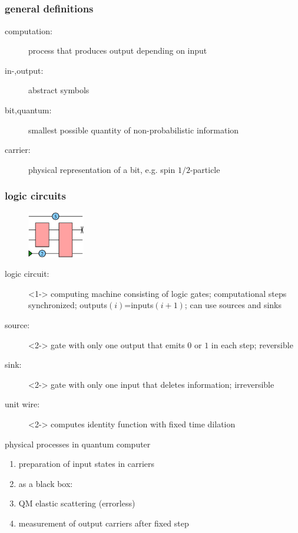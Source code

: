 \documentclass{beamer}
\begin{document}
\subsection[logic circuits]{}
\begin{frame}
	\frametitle{general definitions}
	\begin{description}
		\item[computation:] process that produces output depending on input
		\item[in-,output:] abstract symbols
		\item[bit,quantum:] smallest possible quantity of non-probabilistic information
		\item[carrier:] physical representation of a bit, e.g. spin $1/2$-particle
	\end{description}
\end{frame}
%
\begin{frame}
	\frametitle{logic circuits}
	\begin{figure}
		\centering
		\includegraphics[width=2.5cm]{fig/logic_circuit.png}
	\end{figure}
	\begin{description}
		\item[logic circuit:]<1-> computing machine consisting of logic gates; computational steps synchronized; outputs$(i)$=inputs$(i+1)$; can use sources and sinks
		\item[source:]<2-> gate with only one output that emits $0$ or $1$ in each step; reversible
		\item[sink:]<2-> gate with only one input that deletes information; irreversible
		\item[unit wire:]<2-> computes identity function with fixed time dilation
	\end{description}
\end{frame}
%
\begin{frame}
	\begin{block}{physical processes in quantum computer}
		\begin{enumerate}
			\item preparation of input states in carriers
			\item as a black box:
			\item QM elastic scattering (errorless)
			\item measurement of output carriers after fixed step
		\end{enumerate}
	\end{block}
\end{frame}
%
\end{document}
